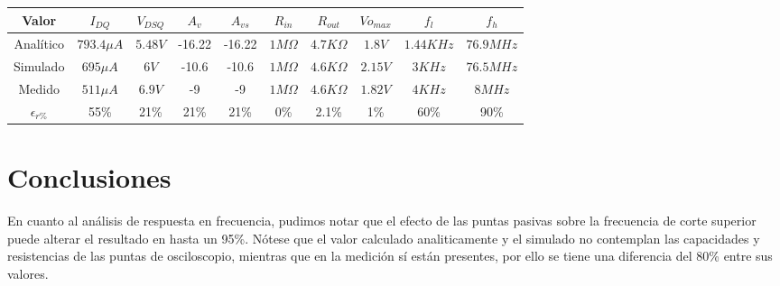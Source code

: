 \documentclass[a4paper, 10pt, spanish]{article}
\begin{document}
\begin{center}
  \begin{tabular}{|c|c|c|c|c|c|c|c|c|c|}
    \hline
    Valor & $I_{DQ}$ & $V_{DSQ}$ & $A_v$ & $A_{vs}$ & $R_{in}$ & $R_{out}$ & $V{o_{max}}$ & $f_l$ & $f_h$ \\
    \hline
    Analítico & $793.4\mu A$& $5.48V$& -16.22 & -16.22 & $1M\Omega$ & $4.7K\Omega$ & $1.8V$ & $1.44KHz$ & $76.9MHz$ \\
    \hline
    Simulado & $695\mu A$ & $6V$ & -10.6 & -10.6 & $1M\Omega$ & $4.6K\Omega$ & $2.15V$ & $3KHz$ & $76.5MHz$ \\
    \hline
    Medido & $511\mu A$ & $6.9V$ & -9 & -9 & $1M\Omega$ & $4.6K\Omega$ & $1.82V$ & $4KHz$ & $8MHz$ \\
    \hline
    \hline
    $\epsilon_{r\%}$ & 55\% & 21\% & 21\% & 21\% & 0\% & 2.1\% & 1\% & 60\% & 90\% \\
    \hline
  \end{tabular}
  \label{tab:comparativo}
\end{center}

\section{Conclusiones}
	En cuanto al análisis de respuesta en frecuencia, pudimos notar que el efecto de las puntas pasivas sobre la frecuencia de corte superior puede alterar el resultado en hasta un 95\%. Nótese que el valor calculado analiticamente y el simulado no contemplan las capacidades y resistencias de las puntas de osciloscopio, mientras que en la medición sí están presentes, por ello se tiene una diferencia del 80\% entre sus valores.

\end{document}
